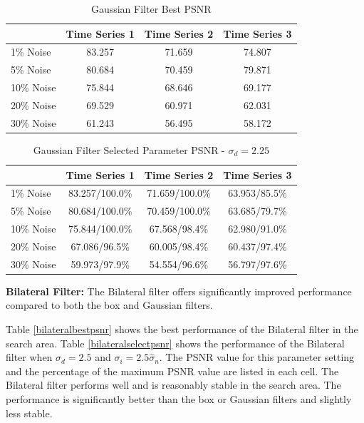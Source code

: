 \documentclass[11pt]{article}
\newcommand{\vs}{\vspace{0.1in}}
\theoremstyle{definition}
\begin{document}
\begin{table}[!h]
\small
\begin{center}
\begin{tabular}{l | c | c | c}
 & Time Series 1 & Time Series 2 & Time Series 3 \\ \hline
1\% Noise & 83.257 & 71.659 & 74.807 \\ \hline
5\% Noise & 80.684 & 70.459 & 79.871 \\ \hline
10\% Noise & 75.844 & 68.646 & 69.177 \\ \hline
20\% Noise & 69.529 & 60.971 & 62.031 \\ \hline
30\% Noise & 61.243 & 56.495 & 58.172
\end{tabular}
\caption{Gaussian Filter Best PSNR}
\label{gaussianbestpsnr}
\end{center}
\end{table}

\begin{table}[!h]
\small
\begin{center}
\begin{tabular}{l | c | c | c}
 & Time Series 1 & Time Series 2 & Time Series 3 \\ \hline
1\% Noise & 83.257/100.0\% & 71.659/100.0\% & 63.953/85.5\% \\ \hline
5\% Noise & 80.684/100.0\% & 70.459/100.0\% & 63.685/79.7\% \\ \hline
10\% Noise & 75.844/100.0\% & 67.568/98.4\% & 62.980/91.0\% \\ \hline
20\% Noise & 67.086/96.5\% & 60.005/98.4\% & 60.437/97.4\% \\ \hline
30\% Noise & 59.973/97.9\% & 54.554/96.6\% & 56.797/97.6\%
\end{tabular}
\caption{Gaussian Filter Selected Parameter PSNR - $\sigma_d = 2.25$}
\label{gaussianselectpsnr}
\end{center}
\end{table}

\vs
\noindent
\textbf{Bilateral Filter:} The Bilateral filter offers significantly improved performance compared to both the box and Gaussian filters.

Table \ref{bilateralbestpsnr} shows the best performance of the Bilateral filter in the search area. Table \ref{bilateralselectpsnr} shows the performance of the Bilateral filter when $\sigma_d = 2.5$ and $\sigma_i = 2.5 \hat{\sigma}_n$. The PSNR value for this parameter setting and the percentage of the maximum PSNR value are listed in each cell. The Bilateral filter performs well and is reasonably stable in the search area. The performance is significantly better than the box or Gaussian filters and slightly less stable.
\end{document}
